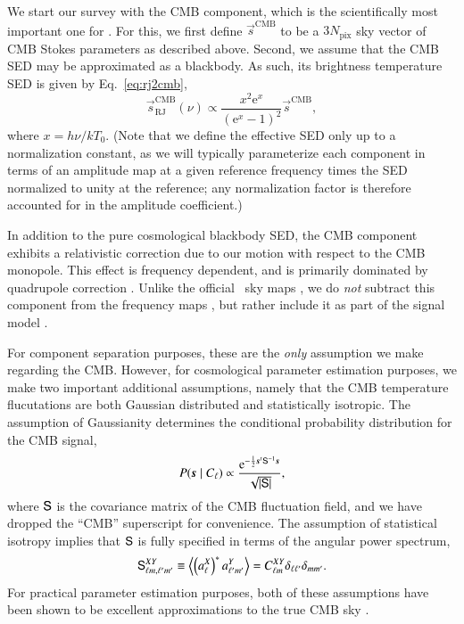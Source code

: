 \documentclass[twocolumn]{aa}
\newcommand{\s}[0]{\vec{s}}
\renewcommand{\S}[0]{\tens{S}}
\newcommand{\e}{\mathrm e}
\begin{document}
We start our survey with the CMB component, which is the
scientifically most important one for \Planck. For this, we first
define $\s^{\mathrm{CMB}}$ to be a $3N_{\mathrm{pix}}$ sky vector of
CMB Stokes parameters as described above. Second, we assume that the CMB
SED may be approximated as a blackbody. As such, its brightness
temperature SED is given by Eq.~\eqref{eq:rj2cmb}, 
\begin{equation}
  \s_{\mathrm{RJ}}^{\mathrm{CMB}}(\nu) \propto
  \frac{x^2\e^x}{\left(\e^{x}-1\right)^2} \s^{\mathrm{CMB}},
\end{equation}
where $x=h\nu/kT_0$. (Note that we define the effective SED only up to
a normalization constant, as we will typically parameterize each
component in terms of an amplitude map at a given reference frequency
times the SED normalized to unity at the reference; any normalization
factor is therefore accounted for in the amplitude coefficient.)

In addition to the pure cosmological blackbody SED, the CMB component
exhibits a relativistic correction due to our motion with respect to
the CMB monopole. This effect is frequency dependent, and is primarily
dominated by quadrupole correction \citep{Notari:2015}. Unlike the
official \Planck\ sky maps \citep{planck2016-l02,npipe}, we do
\emph{not} subtract this component from the frequency maps
\citep{bp10}, but rather include it as part of the
signal model \citep{bp13}.

For component separation purposes, these are the \emph{only} assumption
we make regarding the CMB. However, for cosmological parameter
estimation purposes, we make two important additional assumptions,
namely that the CMB temperature flucutations are both Gaussian
distributed and statistically isotropic. The
assumption of Gaussianity determines the conditional probability
distribution for the CMB signal,
\begin{equation}
  P(\s\mid C_{\ell}) \propto \frac{\e^{-\frac{1}{2}\s^t
      \S^{-1} \s}}{\sqrt{|\S|}},
  \label{eq:Pcmb}
\end{equation}
where $\S$ is the covariance matrix of the CMB fluctuation field, and
we have dropped the ``CMB'' superscript for convenience. The assumption
of statistical isotropy implies that $\S$ is fully specified in terms
of the angular power spectrum,
\begin{equation}
  \S^{XY}_{\ell m, \ell' m'} \equiv \left<\left(a^X_{\ell}\right)^*
  a^{Y}_{\ell' m'}\right> = C^{XY}_{\ell m} \delta_{\ell
    \ell'}\delta_{m m'}.
\end{equation}
For practical parameter estimation purposes, both of these assumptions
have been shown to be excellent approximations to the true CMB sky
\citep[see, e.g.,][and references
  therein]{planck2016-l07,planck2016-l09}.
\end{document}
